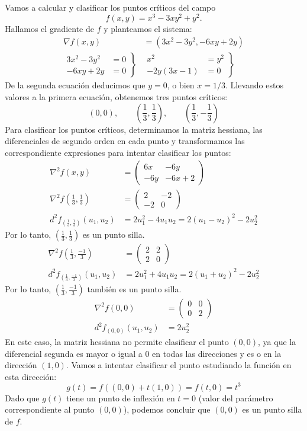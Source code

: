 \begin{ejemplo}
Vamos a calcular y clasificar los puntos críticos del campo
\[
f(x,y)=x^3-3xy^2+y^2.
\]
Hallamos el gradiente de $f$ y planteamos el sistema:
\begin{align*}
\nabla f(x,y) & = (3x^2-3y^2,-6xy+2y) \\[1em]
\left.\begin{array}{rl}
3x^2-3y^2 & = 0\\
-6xy+2y & =0 
\end{array}\right\} & 
\left.\begin{array}{rl}
x^2 & = y^2\\
-2y(3x-1) & =0 
\end{array}\right\}
\end{align*}
De la segunda ecuación deducimos que $y=0$, o bien $x=1/3$.
Llevando estos valores a la primera ecuación, obtenemos tres puntos críticos:
\[
(0,0),\qquad \left(\frac13,\frac13\right),\qquad \left(\frac13,-\frac13\right)
\]
Para clasificar los puntos críticos, determinamos la matriz hessiana, las diferenciales de segundo orden en cada punto y transformamos las correspondiente expresiones para intentar clasificar los puntos:
%
\begin{align*}
\nabla^2f(x,y) &=
\begin{pmatrix}
6x & -6y \\
-6y & -6x+2
\end{pmatrix}\\
\nabla^2f(\tfrac13,\tfrac13) &=
\begin{pmatrix}
2 & -2 \\
-2 & 0
\end{pmatrix}\\
d^2f_{(\frac13,\frac13)}(u_1,u_2) &= 2u_1^2-4u_1u_2 = 2(u_1-u_2)^2-2u_2^2
\end{align*}
Por lo tanto, $(\frac13,\frac13)$ es un punto silla.
\begin{align*}
\nabla^2f(\tfrac13,\tfrac{-1}3) &=
\begin{pmatrix}
2 & 2 \\
2 & 0
\end{pmatrix}\\
d^2f_{(\frac13,\frac{-1}3)}(u_1,u_2) &= 2u_1^2+4u_1u_2 = 2(u_1+u_2)^2-2u_2^2
\end{align*}
Por lo tanto, $(\frac13,\frac{-1}3)$ también es un punto silla.
\begin{align*}
\nabla^2f(0,0) &=
\begin{pmatrix}
0 & 0 \\
0 & 2
\end{pmatrix}\\
d^2f_{(0,0)}(u_1,u_2) &= 2u_2^2
\end{align*}
En este caso, la matriz hessiana no permite clasificar el punto $(0,0)$, ya que la diferencial segunda es mayor o igual a 0 en todas las direcciones y es o en la dirección $(1,0)$.
Vamos a intentar clasificar el punto estudiando la función en esta dirección:
\[
g(t)=f((0,0)+t(1,0))=f(t,0)=t^3
\]
Dado que $g(t)$ tiene un punto de inflexión en $t=0$ (valor del parámetro correspondiente al punto $(0,0)$), podemos concluir que $(0,0)$ es un punto silla de $f$.\fej
\end{ejemplo}

